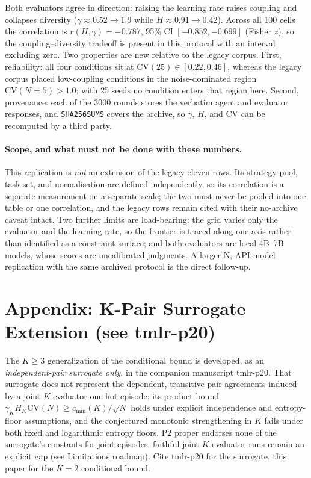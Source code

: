 \documentclass[11pt]{article}
\begin{document}
Both evaluators agree in direction: raising the learning rate raises coupling
and collapses diversity ($\gamma\approx0.52\to1.9$ while $H\approx0.91\to0.42$).
Across all 100 cells the correlation is $r(H,\gamma)=-0.787$, 95\% CI
$[-0.852,-0.699]$ (Fisher $z$), so the coupling--diversity tradeoff is present in
this protocol with an interval excluding zero. Two properties are new relative to
the legacy corpus. First, reliability: all four conditions sit at
$\mathrm{CV}(25)\in[0.22,0.46]$, whereas the legacy corpus placed
low-coupling conditions in the noise-dominated region
$\mathrm{CV}(N{=}5)>1.0$; with 25 seeds no condition enters that region here.
Second, provenance: each of the 3000 rounds stores the verbatim agent and
evaluator responses, and \texttt{SHA256SUMS} covers the archive, so $\gamma$,
$H$, and $\mathrm{CV}$ can be recomputed by a third party.

\paragraph{Scope, and what must not be done with these numbers.} This
replication is \emph{not} an extension of the legacy eleven rows. Its strategy
pool, task set, and normalisation are defined independently, so its correlation
is a separate measurement on a separate scale; the two must never be pooled into
one table or one correlation, and the legacy rows remain cited with their
no-archive caveat intact. Two further limits are load-bearing: the grid varies
only the evaluator and the learning rate, so the frontier is traced along one
axis rather than identified as a constraint surface; and both evaluators are
local 4B--7B models, whose scores are uncalibrated judgments. A larger-N,
API-model replication with the same archived protocol is the direct follow-up.

\section*{Appendix: K-Pair Surrogate Extension (see tmlr-p20)}

The $K{\geq}3$ generalization of the conditional bound is developed, as an \emph{independent-pair surrogate only}, in the companion manuscript tmlr-p20. That surrogate does not represent the dependent, transitive pair agreements induced by a joint $K$-evaluator one-hot episode; its product bound $\gamma_K H_K \mathrm{CV}(N) \geq c_{\min}(K)/\sqrt N$ holds under explicit independence and entropy-floor assumptions, and the conjectured monotonic strengthening in $K$ fails under both fixed and logarithmic entropy floors. P2 proper endorses none of the surrogate's constants for joint episodes: faithful joint $K$-evaluator runs remain an explicit gap (see Limitations roadmap). Cite tmlr-p20 for the surrogate, this paper for the $K{=}2$ conditional bound.
\end{document}
